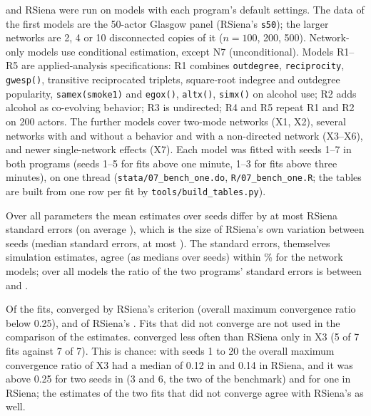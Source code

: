 \nwsaom{} and RSiena were run on \benchnmodels{} models with each program's default
settings. The data of the first \benchnmain{} models are the 50-actor Glasgow panel
(RSiena's \texttt{s50}); the larger networks are 2, 4 or 10 disconnected copies of
it ($n=100$, 200, 500). Network-only models use conditional estimation, except N7
(unconditional). Models R1--R5 are applied-analysis specifications: R1 combines
\texttt{outdegree}, \texttt{reciprocity}, \texttt{gwesp()}, transitive reciprocated
triplets, square-root indegree and outdegree popularity, \texttt{samex(smoke1)} and
\texttt{egox()}, \texttt{altx()}, \texttt{simx()} on alcohol use; R2 adds alcohol as
co-evolving behavior; R3 is undirected; R4 and R5 repeat R1 and R2 on 200 actors.
The \benchnextra{} further models cover two-mode networks (X1, X2), several
networks with and without a behavior and with a non-directed network (X3--X6), and
newer single-network effects (X7). Each model was fitted with seeds 1--7 in
both programs (seeds 1--5 for fits above one minute, 1--3 for fits above three
minutes), on one thread (\texttt{stata/07\_bench\_one.do},
\texttt{R/07\_bench\_one.R}; the tables are built from one row per fit by
\texttt{tools/build\_tables.py}).



Over all \benchnparams{} parameters the mean estimates over seeds differ by at most
\benchmaxdiff{} RSiena standard errors (on average \benchmeandiff{}), which is the
size of RSiena's own variation between seeds (median \benchseedsd{} standard errors,
at most \benchseedsdmax{}). The standard errors, themselves simulation estimates, agree (as medians
over seeds) within \benchnetsepct\% for the network models; over all models the
ratio of the two programs' standard errors is between \benchserlo{} and
\benchserhi{}.

Of the \benchfits{} \nwsaom{} fits, \benchnwconv{} converged by RSiena's criterion
(overall maximum convergence ratio below 0.25), and \benchrsconv{} of RSiena's
\benchrsfits{}. Fits that did not converge are not used in the comparison of the
estimates. \nwsaom{} converged less often than RSiena only in X3 (5 of 7 fits
against 7 of 7). This is chance: with seeds 1 to 20 the overall maximum
convergence ratio of X3 had a median of 0.12 in \nwsaom{} and 0.14 in RSiena, and it
was above 0.25 for two seeds in \nwsaom{} (3 and 6, the two of the benchmark) and
for one in RSiena; the estimates of the two fits that did not converge agree with
RSiena's as well.

